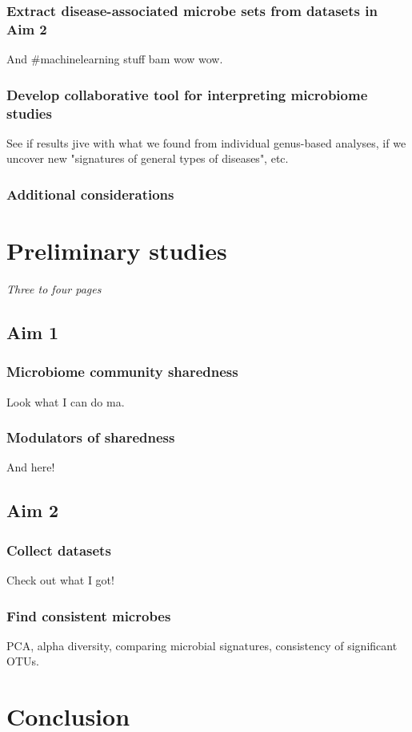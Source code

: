 \documentclass[12pt]{article}
\begin{document}
\subsubsection{Extract disease-associated microbe sets from datasets in Aim 2}
And \#machinelearning stuff bam wow wow.

\subsubsection{Develop collaborative tool for interpreting microbiome studies}
See if results jive with what we found from individual genus-based analyses, if we uncover new "signatures of general types of diseases", etc.

\subsubsection{Additional considerations}

\section{Preliminary studies}
\textit{Three to four pages}

\subsection{Aim 1}
\subsubsection{Microbiome community sharedness}
Look what I can do ma.

\subsubsection{Modulators of sharedness}
And here!

\subsection{Aim 2}
\subsubsection{Collect datasets}
Check out what I got!

\subsubsection{Find consistent microbes}
PCA, alpha diversity, comparing microbial signatures, consistency of significant OTUs.

\section{Conclusion}
\end{document}
